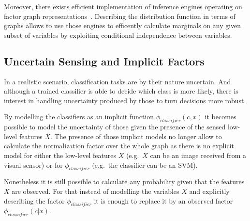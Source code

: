 Moreover, there exists efficient implementation of inference engines operating on factor
graph representations~\cite{Mooij_libDAI_10}.
Describing the distribution function in terms of graphs allows to use those engines to
efficently calculate marginals on any given subset of variables by exploiting conditional
independence between variables.

\subsection{Uncertain Sensing and Implicit Factors}
\label{sec:cues-from-low-level}
In a realistic scenario, classification tasks are by their nature uncertain.
And although a trained classifier is able to decide which class is more likely, there is
interest in handling uncertainty produced by those to turn decisions more robust.

By modelling the classifiers as an implicit function $\phi_{classifier}(c, x)$ it becomes
possible to model the uncertainty of those given the presence of the sensed low-level
features $X$. The presence of those implicit models no longer allow to calculate the
normalization factor over the whole graph as there is no explicit model for either the
low\hyp{}level features $X$ (e.g.\ $X$ can be an image received from a visual sensor)
or for $\phi_{classifier}$ (e.g.\ the classifier can be an \gls{SVM}).

Nonetheless it is still possible to calculate any probability given that the features $X$
are observed. For that instead of modelling the variables $X$ and explicitly describing
the factor $\phi_{classifier}$ it is enough to replace it by an observed factor $\phi_{classifier}(c|x)$.


